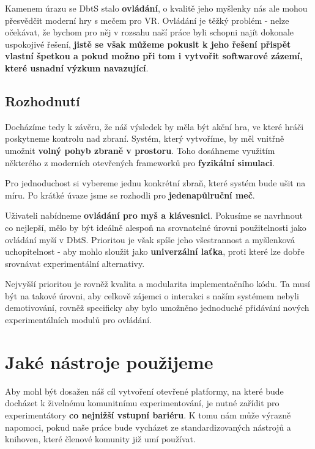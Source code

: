 Kamenem úrazu se \acl{DbtS} stalo \textbf{ovládání}, o kvalitě jeho myšlenky nás ale mohou přesvědčit moderní hry s mečem pro VR. Ovládání je těžký problém - nelze očekávat, že bychom pro něj v rozsahu naší práce byli schopni najít dokonale uspokojivé řešení, \textbf{jistě se však můžeme pokusit k jeho řešení přispět vlastní špetkou a pokud možno při tom i vytvořit softwarové zázemí, které usnadní výzkum navazující}.

\pagebreak

\subsection{Rozhodnutí}

Docházíme tedy k závěru, že náš výsledek by měla být akční hra, ve které hráči poskytneme kontrolu nad zbraní. Systém, který vytvoříme, by měl vnitřně umožnit \textbf{volný pohyb zbraně v prostoru}. Toho dosáhneme využitím některého z moderních otevřených frameworků pro \textbf{fyzikální simulaci}.

Pro jednoduchost si vybereme jednu konkrétní zbraň, které systém bude ušit na míru. Po krátké úvaze jsme se rozhodli pro \textbf{jedenapůlruční meč}.

Uživateli nabídneme \textbf{ovládání pro myš a klávesnici}. Pokusíme se navrhnout co nejlepší, mělo by být ideálně alespoň na srovnatelné úrovni použitelnosti jako ovládání myší v \acl{DbtS}. Prioritou je však spíše jeho všestrannost a myšlenková uchopitelnost - aby mohlo sloužit jako \textbf{univerzální laťka}, proti které lze dobře srovnávat experimentální alternativy. 

Nejvyšší prioritou je rovněž kvalita a modularita implementačního kódu. Ta musí být na takové úrovni, aby celkově zájemci o interakci s naším systémem nebyli demotivování, rovněž specificky aby bylo umožněno jednoduché přidávání nových experimentálních modulů pro ovládání.

\section{Jaké nástroje použijeme}

Aby mohl být dosažen náš cíl vytvoření otevřené platformy, na které bude docházet k živelnému komunitnímu experimentování, je nutné zařídit pro experimentátory \textbf{co nejnižší vstupní bariéru}. K tomu nám může výrazně napomoci, pokud naše práce bude vycházet ze standardizovaných nástrojů a knihoven, které členové komunity již umí používat.


